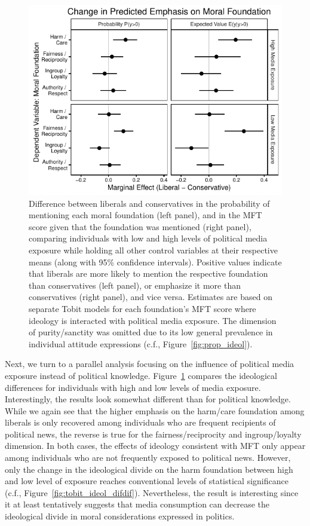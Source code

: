 \documentclass[12pt]{article}
\begin{document}
\begin{figure}[ht]\centering
\includegraphics{../calc/fig/tobit_ideol_media.pdf}
\caption{Difference between liberals and conservatives in the probability of mentioning each moral foundation (left panel), and in the MFT score given that the foundation was mentioned (right panel), comparing individuals with low and high levels of political media exposure while holding all other control variables at their respective means (along with 95\% confidence intervals). Positive values indicate that liberals are more likely to mention the respective foundation than conservatives (left panel), or emphasize it more than conservatives (right panel), and vice versa. Estimates are based on separate Tobit models for each foundation's MFT score where ideology is interacted with political media exposure. The dimension of purity/sanctity was omitted due to its low general prevalence in individual attitude expressions (c.f., Figure~\ref{fig:prop_ideol}).}\label{fig:tobit_ideol_media}
\end{figure}

Next, we turn to a parallel analysis focusing on the influence of political media exposure instead of political knowledge. Figure~\ref{fig:tobit_ideol_media} compares the ideological differences for individuals with high and low levels of media exposure. Interestingly, the results look somewhat different than for political knowledge. While we again see that the higher emphasis on the harm/care foundation among liberals is only recovered among individuals who are frequent recipients of political news, the reverse is true for the fairness/reciprocity and ingroup/loyalty dimension. In both cases, the effects of ideology consistent with MFT only appear among individuals who are not frequently exposed to political news. However, only the change in the ideological divide on the harm foundation between high and low level of exposure reaches conventional levels of statistical significance (c.f., Figure~\ref{fig:tobit_ideol_difdif}). Nevertheless, the result is interesting since it at least tentatively suggests that media consumption can decrease the ideological divide in moral considerations expressed in politics.
\end{document}
